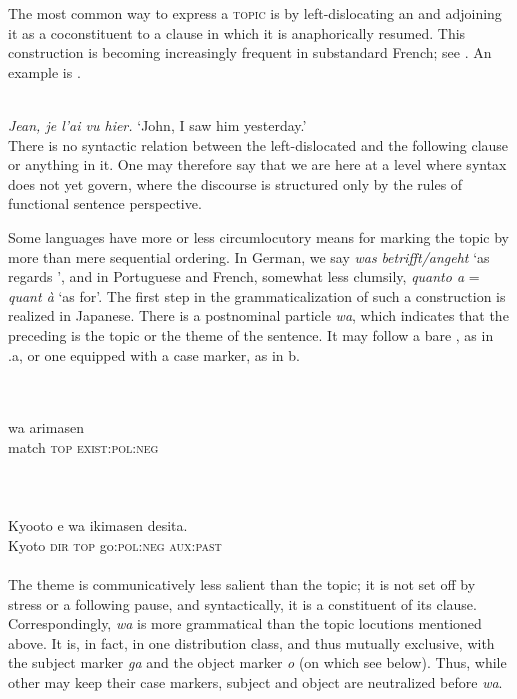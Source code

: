 The most common way to express a \textsc{topic} is by left-dislocating an \np and adjoining it as a coconstituent to a clause in which it is anaphorically resumed. This construction is becoming increasingly frequent in substandard French; see \citet{Ashby1981}. An example is .

\ea\label{ex:E92}
\langinfo{\LangFren}{}{}\\
 {\itshape Jean, je l'ai vu hier.}
\glt ‘John, I saw him yesterday.’\\
\z
\noindent There is no syntactic relation between the left-dislocated \np and the following clause or anything in it. One may therefore say that we are here at a level where syntax does not yet govern, where the discourse is structured only by the rules of functional sentence perspective.

Some languages have more or less circumlocutory means for marking the topic by more than mere sequential ordering. In German, we say \textit{was} \np \textit{betrifft/angeht} ‘as regards \np’, and in Portuguese and French, somewhat less clumsily, \textit{quanto a} = \textit{quant à} ‘as for’. The first step in the grammaticalization of such a construction is realized in Japanese. There is a postnominal particle \textit{wa}, which indicates that the preceding \np is the topic or the theme of the sentence. It may follow a bare \np, as in .a, or one equipped with a case marker, as in b.
 
\ea\label{ex:E93}
\langinfo{\LangJap}{}{} \\
 \ea {}\\
   {wa}  arimasen\\
  {match}  {\textsc{top}}  \textsc{exist}:\textsc{pol}:\textsc{neg}\\
\\
\\
\ex {}\\
\gll  Kyooto  e  wa  ikimasen  desita.\\
  Kyoto   \textsc{dir}   \textsc{top}   go:\textsc{pol}:\textsc{neg}   \textsc{aux}:\textsc{past}\\
\\
\z
\z
\noindent The theme is communicatively less salient than the topic; it is not set off by stress or a following pause, and syntactically, it is a constituent of its clause. Correspondingly, \textit{wa} is more grammatical than the topic locutions mentioned above. It is, in fact, in one distribution class, and thus mutually exclusive, with the subject marker \textit{ga} and the object marker \textit{o} (on which see below). Thus, while other \nps may keep their case markers, subject and object are neutralized before \textit{wa}.

